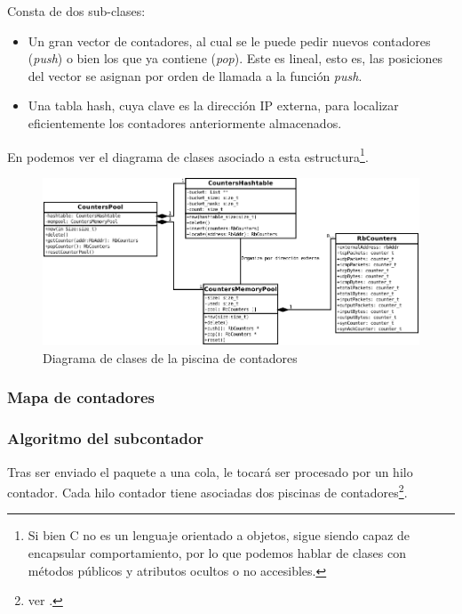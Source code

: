 Consta de dos sub-clases:
\begin{itemize}
 \item Un gran vector de contadores, al cual se le puede pedir nuevos contadores (\emph{push}) o bien los que ya 
contiene (\emph{pop}). Este es lineal, esto es, las posiciones del vector se asignan por orden de llamada a la función 
\emph{push}.
 \item Una tabla hash, cuya clave es la dirección IP externa, para localizar eficientemente los contadores 
anteriormente almacenados.
\end{itemize}

En  podemos ver el diagrama de clases asociado a esta estructura\footnote{Si bien C no es un 
lenguaje orientado a objetos, sigue siendo capaz de encapsular comportamiento, por lo que podemos hablar de clases 
con métodos públicos y atributos ocultos o no accesibles.}.

\begin{figure}[htbp]
\centering
\includegraphics[width=\textwidth]{CapituloEstructura/Figuras/DiagramaClasesContadores-crop}
\caption{Diagrama de clases de la piscina de contadores}
\end{figure}
%

\subsubsection{Mapa de contadores}

\subsubsection{Algoritmo del subcontador}
Tras ser enviado el paquete a una cola, le tocará ser procesado por un hilo contador. Cada hilo contador tiene 
asociadas dos piscinas de contadores\footnote{ver .}. 

